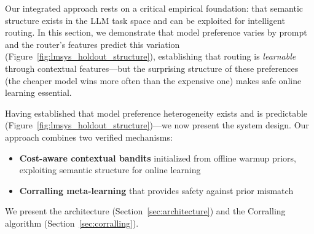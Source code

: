 

Our integrated approach rests on a critical empirical foundation: that semantic structure exists in the LLM task space and can be exploited for intelligent routing. In this section, we demonstrate that model preference varies by prompt and the router's features predict this variation (Figure~\ref{fig:lmsys_holdout_structure}), establishing that routing is \emph{learnable} through contextual features---but the surprising structure of these preferences (the cheaper model wins more often than the expensive one) makes safe online learning essential.


Having established that model preference heterogeneity exists and is predictable (Figure~\ref{fig:lmsys_holdout_structure})---we now present the system design. Our approach combines two verified mechanisms:

\begin{itemize}
    \item \textbf{Cost-aware contextual bandits} initialized from offline warmup priors, exploiting semantic structure for online learning
    \item \textbf{Corralling meta-learning} that provides safety against prior mismatch
\end{itemize}

We present the architecture (Section~\ref{sec:architecture}) and the Corralling algorithm (Section~\ref{sec:corralling}).

